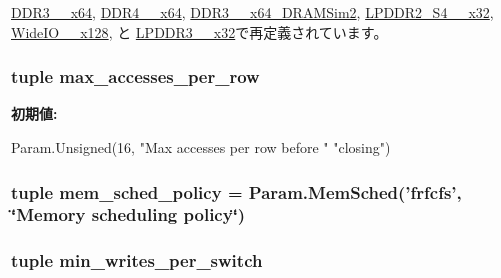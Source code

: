 \hyperlink{classDRAMCtrl_1_1DDR3__1600__x64_a60039c77757fd0118d81754311d71cfb}{DDR3\_\_\-x64}, \hyperlink{classDRAMCtrl_1_1DDR4__2400__x64_a60039c77757fd0118d81754311d71cfb}{DDR4\_\_\-x64}, \hyperlink{classDRAMCtrl_1_1DDR3__1333__x64__DRAMSim2_a60039c77757fd0118d81754311d71cfb}{DDR3\_\_\-x64\_\-DRAMSim2}, \hyperlink{classDRAMCtrl_1_1LPDDR2__S4__1066__x32_a60039c77757fd0118d81754311d71cfb}{LPDDR2\_\-S4\_\_\-x32}, \hyperlink{classDRAMCtrl_1_1WideIO__200__x128_a60039c77757fd0118d81754311d71cfb}{WideIO\_\_\-x128}, と \hyperlink{classDRAMCtrl_1_1LPDDR3__1600__x32_a60039c77757fd0118d81754311d71cfb}{LPDDR3\_\_\-x32}で再定義されています。\hypertarget{classDRAMCtrl_1_1DRAMCtrl_a2c202719d898485a257f5e005b9d2706}{
\subsubsection[{max\_\-accesses\_\-per\_\-row}]{\setlength{\rightskip}{0pt plus 5cm}tuple {\bf max\_\-accesses\_\-per\_\-row}}}
\label{classDRAMCtrl_1_1DRAMCtrl_a2c202719d898485a257f5e005b9d2706}
{\bfseries 初期値:}
\begin{DoxyCode}
Param.Unsigned(16, "Max accesses per row before "
                                          "closing")
\end{DoxyCode}
\hypertarget{classDRAMCtrl_1_1DRAMCtrl_ae14f8bbae75800115807fdeb5540a8ef}{
\subsubsection[{mem\_\-sched\_\-policy}]{\setlength{\rightskip}{0pt plus 5cm}tuple {\bf mem\_\-sched\_\-policy} = Param.MemSched('frfcfs', \char`\"{}Memory scheduling policy\char`\"{})}}
\label{classDRAMCtrl_1_1DRAMCtrl_ae14f8bbae75800115807fdeb5540a8ef}
\hypertarget{classDRAMCtrl_1_1DRAMCtrl_aae741e23886d2d87de163d08ce065b7a}{
\subsubsection[{min\_\-writes\_\-per\_\-switch}]{\setlength{\rightskip}{0pt plus 5cm}tuple {\bf min\_\-writes\_\-per\_\-switch}}}
